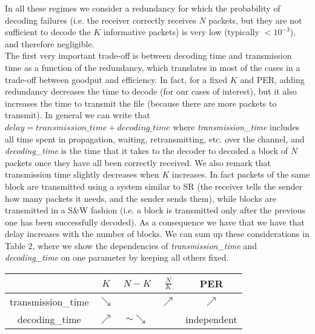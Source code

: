 In all these regimes we consider a redundancy for which the probability of decoding failures (i.e. the receiver correctly receives $N$ packets, but they are not sufficient to decode the $K$ informative packets) is very low (typically $<10^{-3}$), and therefore negligible. \\
The first very important trade-off is between decoding time and transmission time as a function of the redundancy, which translates in most of the cases in a trade-off between goodput and efficiency. In fact, for a fixed $K$ and PER, adding redundancy decreases the time to decode (for our cases of interest), but it also increases the time to transmit the file (because there are more packets to transmit). In general we can write that $delay=transmission\_time+decoding\_time$ where \emph{transmission\_time} includes all time spent in propagation, waiting, retransmitting, etc. over the channel, and \emph{decoding\_time} is the time that it takes to the decoder to decoded a block of $N$ packets once they have all been correctly received. We also remark that transmission time slightly decreases when $K$ increases. In fact packets of the same block are transmitted using a system similar to SR (the receiver tells the sender how many packets it needs, and the sender sends them), while blocks are transmitted in a S\&W fashion (i.e. a block is transmitted only after the previous one has been successfully decoded). As a consequence we have that we have that delay increases with the number of blocks. We can sum up these considerations in Table 2, where we show the dependencies of \emph{transmission\_time} and \emph{decoding\_time} on one parameter by keeping all others fixed.
\begin{center}
\begin{tabular}{c|c|c|c|c}

\toprule
&$K$&$N-K$&$\frac{N}{K}$&PER\\
\midrule
transmission\_time&$\searrow$& & $\nearrow$&$\nearrow$\\ \hline
decoding\_time&$\nearrow$&$\sim \searrow$&&independent\\ 
\bottomrule
\end{tabular}
\end{center}

